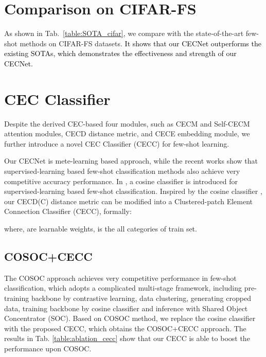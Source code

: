 \documentclass{article}
\newcommand{\jinxiang}[1]{\textcolor{black}{#1}}
\begin{document}
\section{Comparison on CIFAR-FS}
As shown in Tab.~\ref{table:SOTA_cifar}, we compare with the state-of-the-art few-shot methods on CIFAR-FS datasets.
\jinxiang{It shows that our CECNet outperforms the existing SOTAs, which demonstrates the effectiveness and strength of our CECNet.}



\section{CEC Classifier}
Despite the derived CEC-based four modules, such as CECM and Self-CECM attention modules, CECD distance metric, and CECE embedding module, we further introduce a novel CEC Classifier (CECC) for few-shot learning.

Our CECNet is mete-learning based approach, while the recent works show that supervised-learning based few-shot classification methods \cite{chen2019closer,tian2020rethinking,xu2021Rectifying} also achieve very competitive accuracy performance.
In \cite{chen2019closer}, a cosine classifier is introduced for supervised-learning based few-shot classification. Inspired by the cosine classifier \cite{chen2019closer}, our CECD(C) distance metric can be modified into a Clustered-patch Element Connection Classifier (CECC), formally:
\setcounter{equation}{16}

where,  are learnable weights,  is the all categories of train set.

\subsection{COSOC+CECC}
The COSOC \cite{xu2021Rectifying} approach achieves very competitive performance in few-shot classification, which adopts a complicated multi-stage framework, including pre-training backbone by contrastive learning, data clustering, generating cropped data, training backbone by cosine classifier and inference with Shared Object Concentrator (SOC).
Based on COSOC method, we replace the cosine classifier with the proposed CECC, which obtains the COSOC+CECC approach. The results in Tab. \ref{table:ablation_cecc} show that our CECC is able to boost the performance upon COSOC.
\end{document}
